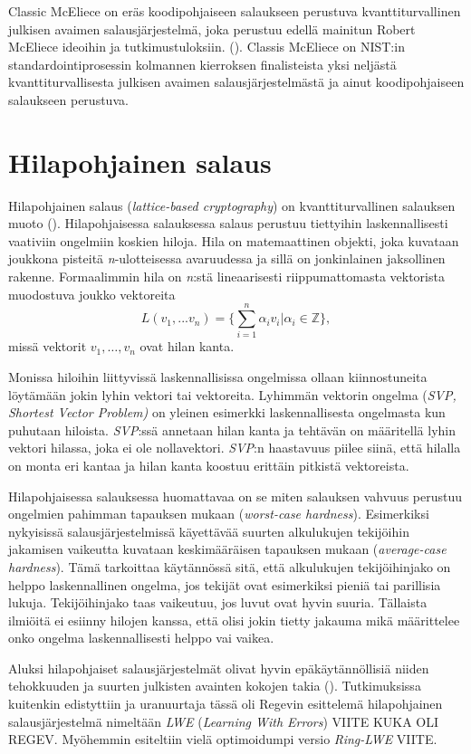 Classic McEliece on eräs koodipohjaiseen salaukseen perustuva kvanttiturvallinen julkisen avaimen salausjärjestelmä, joka perustuu edellä mainitun Robert McEliece ideoihin ja tutkimustuloksiin. (\cite{alagic2020status}). Classis McEliece on NIST:in standardointiprosessin kolmannen kierroksen finalisteista yksi neljästä kvanttiturvallisesta julkisen avaimen salausjärjestelmästä ja ainut koodipohjaiseen salaukseen perustuva.

\section{Hilapohjainen salaus}
Hilapohjainen salaus (\emph{lattice-based cryptography}) on kvanttiturvallinen salauksen muoto (\cite{regev2006lattice}). Hilapohjaisessa salauksessa salaus perustuu tiettyihin laskennallisesti vaativiin ongelmiin koskien hiloja. Hila on matemaattinen objekti, joka kuvataan joukkona pisteitä \emph{n}-ulotteisessa avaruudessa ja sillä on jonkinlainen jaksollinen rakenne. Formaalimmin hila on \emph{n}:stä lineaarisesti riippumattomasta vektorista muodostuva joukko vektoreita 
\[L(v_1,...v_n) =\Bigg\{ {\sum_{i=1}^{n}\alpha_i 
v_i|\alpha_i \in \mathbb{Z}} \Bigg\},\]
missä vektorit $v_1, \ldots ,v_n$ ovat hilan kanta.

Monissa hiloihin liittyvissä 
laskennallisissa ongelmissa ollaan kiinnostuneita löytämään jokin lyhin vektori tai vektoreita. Lyhimmän vektorin ongelma (\emph{SVP, Shortest Vector Problem)} on yleinen esimerkki laskennallisesta ongelmasta kun puhutaan hiloista. \emph{SVP}:ssä annetaan hilan kanta ja tehtävän on määritellä lyhin vektori hilassa, joka ei ole nollavektori. \emph{SVP}:n haastavuus piilee siinä, että hilalla on monta eri kantaa ja hilan kanta koostuu erittäin pitkistä vektoreista.

Hilapohjaisessa salauksessa huomattavaa on se miten salauksen vahvuus perustuu ongelmien pahimman tapauksen mukaan (\emph{worst-case hardness}). Esimerkiksi nykyisissä salausjärjestelmissä käyettävää suurten alkulukujen tekijöihin jakamisen vaikeutta kuvataan keskimääräisen tapauksen mukaan (\emph{average-case hardness}). Tämä tarkoittaa käytännössä sitä, että alkulukujen tekijöihinjako on helppo laskennallinen ongelma, jos tekijät ovat esimerkiksi pieniä tai parillisia lukuja. Tekijöihinjako taas vaikeutuu, jos luvut ovat hyvin suuria. Tällaista ilmiöitä ei esiinny hilojen kanssa, että olisi jokin tietty jakauma mikä määrittelee onko ongelma laskennallisesti helppo vai vaikea.

Aluksi hilapohjaiset salausjärjestelmät olivat hyvin epäkäytännöllisiä niiden tehokkuuden ja suurten julkisten avainten kokojen takia (\cite{8275352}). Tutkimuksissa kuitenkin edistyttiin ja uranuurtaja tässä oli Regevin esittelemä hilapohjainen salausjärjestelmä nimeltään \emph{LWE} (\emph{Learning With Errors}) VIITE KUKA OLI REGEV. Myöhemmin esiteltiin vielä optimoidumpi versio \emph{Ring-LWE} VIITE.

